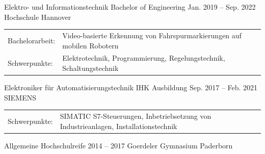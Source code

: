 \documentclass[12pt, a4paper]{awsome-cv-timeline}
\begin{document}
\begin{textblock*}
\begin{cventries}
			\cventry%
				{Elektro- und Informationstechnik}
				{Bachelor of Engineering}
				{Jan. 2019 -- Sep. 2022}
				{Hochschule Hannover}
				{
					\begin{tabularx}{\textwidth}{@{}l@{\quad}X}
						Bachelorarbeit: & Video-basierte Erkennung von Fahrspurmarkierungen auf mobilen Robotern \\
						Schwerpunkte: &
							Elektrotechnik,
							Programmierung,
							Regelungstechnik,
							Schaltungstechnik
					\end{tabularx}
					\vspace{-.5\baselineskip}
				}

			\cventry%
				{Elektroniker für Automatisierungstechnik}
				{IHK Ausbildung}
				{Sep. 2017 -- Feb. 2021}
				{SIEMENS}
				{%
					\begin{tabularx}{\textwidth}{@{}l@{\quad}X}
						Schwerpunkte: &
						SIMATIC S7-Steuerungen,
						Inbetriebsetzung von Industrieanlagen,
						Installationstechnik
					\end{tabularx}
				}
				\vspace{-.4\baselineskip}
				\vspace{-.5\baselineskip}

			\cventry%
				{}
				{Allgemeine Hochschulreife}
				{2014 -- 2017}
				{Goerdeler Gymnasium Paderborn}
				{}
		\end{cventries}


\end{textblock*}
\end{document}
